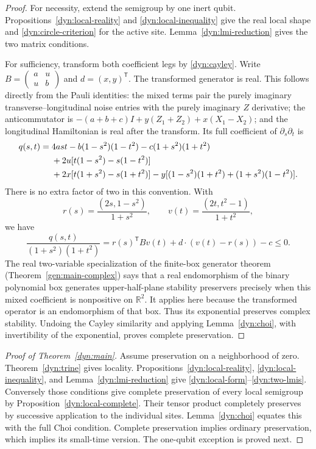 \documentclass[reqno]{amsart}
\theoremstyle{definition}
\theoremstyle{remark}
\newcommand{\R}{\mathbb R}
\begin{document}
\begin{proof}
For necessity, extend the semigroup by one inert qubit.
Propositions~\ref{dyn:local-reality} and \ref{dyn:local-inequality} give the
real local shape and \eqref{dyn:circle-criterion} for the active site.
Lemma~\ref{dyn:lmi-reduction} gives the two matrix conditions.

For sufficiency, transform both coefficient legs by \eqref{dyn:cayley}.
Write $B=\left(\begin{smallmatrix}a&u\\u&b\end{smallmatrix}\right)$ and
$d=(x,y)^{\mathsf T}$.  The transformed generator is real.  This follows
directly from the Pauli identities: the mixed terms pair the purely
imaginary transverse--longitudinal noise entries with the purely imaginary
$Z$ derivative; the anticommutator is
$-(a+b+c)I+y(Z_1+Z_2)+x(X_1-X_2)$; and the longitudinal Hamiltonian is real
after the transform.  Its full coefficient of $\partial_s\partial_t$ is
\begin{align}\label{dyn:local-q}
 q(s,t)={}&4ast-b(1-s^2)(1-t^2)-c(1+s^2)(1+t^2)\notag\\
 &+2u[t(1-s^2)-s(1-t^2)]\notag\\
 &+2x[t(1+s^2)-s(1+t^2)]
 -y[(1-s^2)(1+t^2)+(1+s^2)(1-t^2)].
\end{align}
There is no extra factor of two in this convention.  With
\[
 r(s)=\frac{(2s,1-s^2)}{1+s^2},\qquad
 v(t)=\frac{(2t,t^2-1)}{1+t^2},
\]
we have
\begin{equation}\label{dyn:q-circle}
 \frac{q(s,t)}{(1+s^2)(1+t^2)}
 =r(s)^{\mathsf T}Bv(t)+d\cdot(v(t)-r(s))-c\le0.
\end{equation}
The real two-variable specialization of the finite-box generator theorem
(Theorem~\ref{gen:main-complex}) says that a real endomorphism of the binary
polynomial box generates upper-half-plane stability preservers precisely
when this mixed coefficient is nonpositive on $\R^2$.
It applies here because the transformed operator is an endomorphism of
that box.  Thus its exponential preserves complex stability.
Undoing the Cayley similarity and applying Lemma~\ref{dyn:choi}, with
invertibility of the exponential, proves complete preservation.
\end{proof}

\begin{proof}[Proof of Theorem~\ref{dyn:main}]
Assume preservation on a neighborhood of zero.  Theorem~\ref{dyn:trine}
gives locality.  Propositions~\ref{dyn:local-reality},
\ref{dyn:local-inequality}, and Lemma~\ref{dyn:lmi-reduction} give
\eqref{dyn:local-form}--\eqref{dyn:two-lmis}.  Conversely those conditions
give complete preservation of every local semigroup by
Proposition~\ref{dyn:local-complete}.  Their tensor product completely
preserves by successive application to the individual sites.
Lemma~\ref{dyn:choi} equates this with the full Choi condition.
Complete preservation implies ordinary preservation, which implies its
small-time version.  The one-qubit exception is proved next.
\end{proof}
\end{document}
